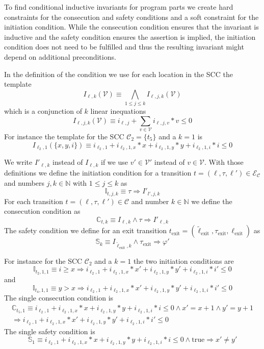 To find conditional inductive invariants for program parts we create hard constraints for the consecution and safety conditions and a soft constraint for the initiation condition.
While the consecution condition ensures that the invariant is inductive and the safety condition ensures the assertion is implied, the initiation condition does not need to be fulfilled and thus the resulting invariant might depend on additional preconditions.  

In the definition of the condition we use for each location in the SCC the template \[ I_{\ell,k}(\mathcal{V}) \equiv \bigwedge_{1 \leq j \leq k}{I_{\ell,j,k}(\mathcal{V})} \] which is a conjunction of $k$ linear inequations \[ I_{\ell,j,k}(\mathcal{V}) \equiv i_{\ell,j} + \sum_{v \in \mathcal{V}}{i_{\ell,j,v} * v} \leq 0 \]
For instance the template for the SCC $\mathcal{C}_2 = \lbrace t_5 \rbrace$ and a $k=1$ is \[ I_{\ell_2,1}(\lbrace x, y, i \rbrace) \equiv i_{\ell_2,1} + i_{\ell_2,1,x} * x + i_{\ell_2,1,y} * y + i_{\ell_2,1,i} * i \leq 0 \]

We write $I'_{\ell,k}$ instead of $I_{\ell,k}$ if we use $v' \in \mathcal{V}'$ instead of $v \in \mathcal{V}$.
With those definitions we define the initiation condition for a transition $t = (\ell, \tau, \ell') \in \mathcal{E}_\mathcal{C}$ and numbers $j, k \in \mathbb{N}$ with $1 \leq j \leq k$ as \[ \mathbb{I}_{t,j,k} \equiv \tau \Rightarrow I'_{l',j,k} \]
For each transition $t = (\ell, \tau, \ell') \in \mathcal{C}$ and number $k \in \mathbb{N}$ we define the consecution condition as \[ \mathbb{C}_{t,k} \equiv I_{\ell,k} \wedge \tau \Rightarrow I'_{\ell,k} \]
The safety condition we define for an exit transition $t_\text{exit} = (\tilde{\ell}_\text{exit}, \tau_\text{exit}, \ell_\text{exit})$ as \[ \mathbb{S}_k \equiv I_{\tilde{\ell}_\text{exit},k} \wedge \tau_\text{exit} \Rightarrow \varphi' \]

For instance for the SCC $\mathcal{C}_2$ and a $k=1$ the two initiation conditions are \[ \mathbb{I}_{t_2, 1, 1} \equiv i \geq x \Rightarrow i_{\ell_2,1} + i_{\ell_2,1,x} * x' + i_{\ell_2,1,y} * y' + i_{\ell_2,1,i} * i' \leq 0 \] and \[ \mathbb{I}_{t_4, 1, 1} \equiv y > x \Rightarrow i_{\ell_2,1} + i_{\ell_2,1,x} * x' + i_{\ell_2,1,y} * y' + i_{\ell_2,1,i} * i' \leq 0 \]
The single consecution condition is
\begin{multline}
  \mathbb{C}_{t_5, 1} \equiv i_{\ell_2,1} + i_{\ell_2,1,x} * x + i_{\ell_2,1,y} * y + i_{\ell_2,1,i} * i \leq 0 \wedge x' = x + 1 \wedge y' = y + 1 \\
  \Rightarrow i_{\ell_2,1} + i_{\ell_2,1,x} * x' + i_{\ell_2,1,y} * y' + i_{\ell_2,1,i} * i' \leq 0
\end{multline}
The single safety condition is
\[ \mathbb{S}_1 \equiv i_{\ell_2,1} + i_{\ell_2,1,x} * x + i_{\ell_2,1,y} * y + i_{\ell_2,1,i} * i \leq 0 \wedge \text{true} \Rightarrow x' \neq y' \]
  
